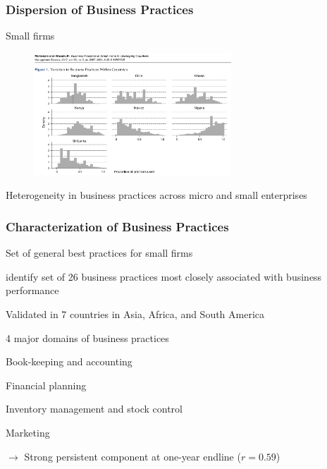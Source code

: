 \documentclass[hideothersubsections, usenames,dvipsnames,11pt]{beamer}
\newenvironment{itemize_2pt}{\itemize\addtolength{\itemsep}{2pt}}{\enditemize}
\newenvironment{enumerate_2pt}{\enumerate\addtolength{\itemsep}{2pt}}{\endenumerate}
\begin{document}
\begin{frame}
\frametitle{Dispersion of Business Practices}

Small firms

\begin{figure}[htbp]
	\centering
	\includegraphics[width=20em]{pics/McKenzie2017_mgmtdispersion.png}
	\label{McKenzie(2017): Mgmt practices}
\end{figure}

\vspace{-1.0em}

\begin{itemize_2pt}
	\item Heterogeneity in business practices across micro and small enterprises \citep{McKenzie2017}
\end{itemize_2pt}
\end{frame}



\begin{frame}
\frametitle{Characterization of Business Practices}

Set of general best practices for small firms

\begin{itemize_2pt}
	\item \citet{McKenzie2017} identify set of \textcolor{bdf}{26 business practices} most closely associated with business performance
		
	\begin{itemize_2pt}	
	\vspace{0.5em}
	
		\item Validated in \textcolor{bdf}{7 countries} in Asia, Africa, and South America

		\item \textcolor{bdf}{4 major domains} of business practices
		\begin{enumerate_2pt}
			\item Book-keeping and accounting
			\item Financial planning
			\item Inventory management and stock control
			\item Marketing
		\end{enumerate_2pt}	
		
		\vspace{0.5em}	
		
		\item[] $\rightarrow$ \textcolor{bdf}{Strong persistent component} at one-year endline ($r=0.59$)
	\end{itemize_2pt}
	
\end{itemize_2pt}

\end{frame}
\end{document}
